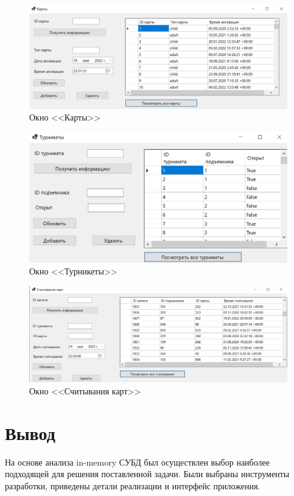 \begin{figure}[h!]
	\begin{center}
		\includegraphics[scale=0.6]{../imgs/int/cards.png}
	\end{center}
	\captionsetup{justification=centering}
	\caption{Окно <<Карты>>}
	\label{img:cards}
\end{figure}

\begin{figure}[h!]
	\begin{center}
		\includegraphics[scale=0.6]{../imgs/int/turnstiles.png}
	\end{center}
	\captionsetup{justification=centering}
	\caption{Окно <<Турникеты>>}
	\label{img:turnstiles}
\end{figure}

\begin{figure}[h!]
	\begin{center}
		\includegraphics[scale=0.6]{../imgs/int/readings.png}
	\end{center}
	\captionsetup{justification=centering}
	\caption{Окно <<Считывания карт>>}
	\label{img:readings}
\end{figure}

\clearpage
\section*{Вывод}

На основе анализа in-memory СУБД был осуществлен выбор наиболее подходящей для решения поставленной задачи. Были выбраны инструменты разработки, приведены детали реализации и интерфейс приложения.